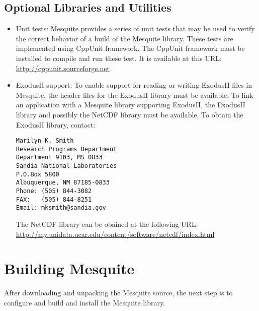 \subsection{Optional Libraries and Utilities}
\label{sec:depends}
\begin{itemize}
\item Unit tests:  Mesquite provides a series of unit tests that may be used
to verify the correct behavior of a build of the Mesquite library.  These tests
are implemented using CppUnit framework.  The CppUnit framework must be installed
to compile and run these test.  It is available at this URL:
\url{http://cppunit.sourceforge.net}
\item ExodusII support:  To enable support for reading or writing ExodusII files in Mesquite, the header files for the ExodusII library must be available.  To link an application with a Mesquite library supporting ExodusII, the ExodusII library and possibly the NetCDF library must be available.  To obtain the ExodusII library, contact:
\begin{verbatim}
Marilyn K. Smith
Research Programs Department
Department 9103, MS 0833
Sandia National Laboratories
P.O.Box 5800
Albuquerque, NM 87185-0833
Phone: (505) 844-3082
FAX:   (505) 844-8251
Email: mksmith@sandia.gov
\end{verbatim}
The NetCDF library can be obained at the following URL:
\url{http://my.unidata.ucar.edu/content/software/netcdf/index.html}
\end{itemize}


\section{Building Mesquite}
\label{sec:compiling}
After downloading and unpacking the Mesquite source, the next step is to 
configure and build and install the Mesquite library.  
